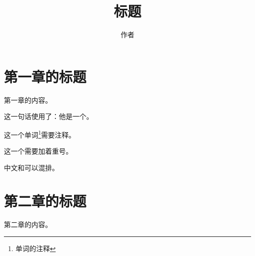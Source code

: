 \documentclass{article}
\title{标题}
\author{作者}
\begin{document}
\maketitle
\tableofcontents
\newpage

\section{第一章的标题}

第一章的内容。

这一句话使用了：他是一个。

这一个单词\footnote{单词的注释}需要注释。

这一个需要加着重号。

中文和{\mincho {}}可以混排。

\section{第二章的标题}

第二章的内容。
\end{document}
